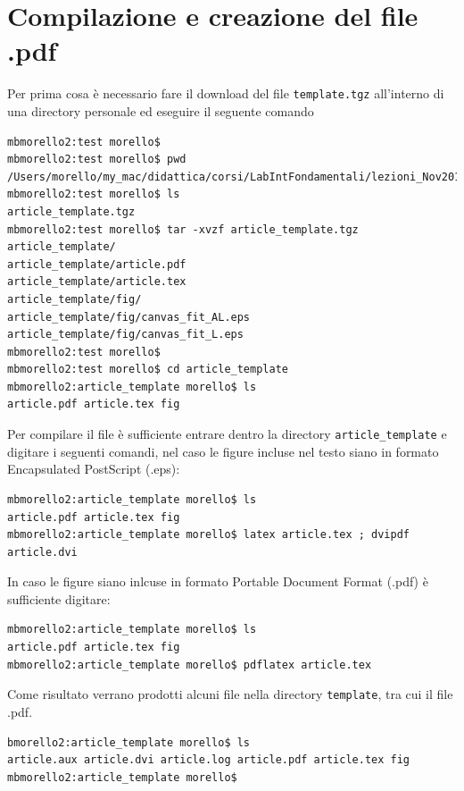 \documentclass[a4paper,10pt]{article}
\begin{document}
\section{Compilazione e creazione del file .pdf}
\label{sec:compilazione} 

Per prima cosa \`e necessario fare il download del file \texttt{template.tgz} all'interno di una directory 
personale ed eseguire il seguente comando
\begin{verbatim}
mbmorello2:test morello$ 
mbmorello2:test morello$ pwd
/Users/morello/my_mac/didattica/corsi/LabIntFondamentali/lezioni_Nov2014/latex_template/test
mbmorello2:test morello$ ls
article_template.tgz
mbmorello2:test morello$ tar -xvzf article_template.tgz 
article_template/
article_template/article.pdf
article_template/article.tex
article_template/fig/
article_template/fig/canvas_fit_AL.eps
article_template/fig/canvas_fit_L.eps
mbmorello2:test morello$ 
mbmorello2:test morello$ cd article_template
mbmorello2:article_template morello$ ls
article.pdf article.tex fig
\end{verbatim}

\noindent
Per compilare il file \`e sufficiente entrare dentro la directory \texttt{article\_template} e  digitare i seguenti comandi,
 nel caso le figure incluse nel testo siano in formato Encapsulated PostScript (.eps):
\begin{verbatim} 
mbmorello2:article_template morello$ ls
article.pdf article.tex fig
mbmorello2:article_template morello$ latex article.tex ; dvipdf article.dvi
\end{verbatim}
%
In caso le figure siano inlcuse in formato  Portable Document Format (.pdf) \`e sufficiente digitare: 
\begin{verbatim}
mbmorello2:article_template morello$ ls
article.pdf article.tex fig
mbmorello2:article_template morello$ pdflatex article.tex
\end{verbatim}
Come risultato verrano prodotti alcuni file nella directory \texttt{template}, tra cui il file .pdf.
\begin{verbatim}
bmorello2:article_template morello$ ls
article.aux article.dvi article.log article.pdf article.tex fig
mbmorello2:article_template morello$ 
\end{verbatim}

\end{document}
